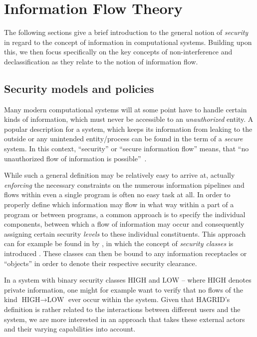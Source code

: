 
\section{Information Flow Theory} 
The following sections give a brief introduction to the general notion of \emph{security} in regard to the concept of information in computational systems.
Building upon this, we then focus specifically on the key concepts of non-interference and declassification as they relate to the notion of information flow.
\subsection{Security models and policies}
Many modern computational systems will at some point have to handle certain kinds of information, which must never be accessible to an \emph{unauthorized} entity.
A popular description for a system, which keeps its information from leaking to the outside or any unintended entity/process can be found in the term of a  \emph{secure} system.
In this context, ``security'' or ``secure information flow'' means, that ``no unauthorized flow of information is possible''~\cite{lattice_model_security}.

While such a general definition may be relatively easy to arrive at, actually \emph{enforcing} the necessary constraints on the numerous information pipelines and flows within even a single program is often no easy task at all. 
In order to properly define which information may flow in what way within a part of a program or between programs, a common approach is to specify the individual components, between which a flow of information may occur and consequently assigning certain security \emph{levels} to these individual constituents. This approach can for example be found in  by \citeauthor{lattice_model_security}, in which the concept of \emph{security classes} is introduced \cite{lattice_model_security}. These classes can then be bound to any information receptacles or ``objects'' in order to denote their respective security clearance.

In a system with binary security classes \(\text{HIGH}\) and \(\text{LOW}\) -- where \(\text{HIGH}\) denotes private information, one might for example want to verify that no flows of the kind \(\text{HIGH} \rightarrow \text{LOW}\) ever occur within the system.
Given that HAGRID's definition is rather related to the interactions between different users and the system, we are more interested in an approach that takes these external actors and their varying capabilities into account.

